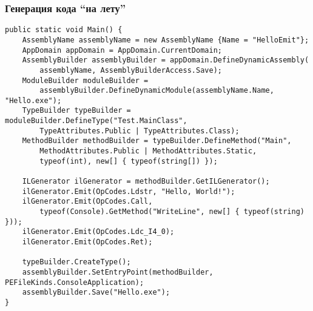 \documentclass{../../slides-style}
\begin{document}
    \begin{frame}[fragile]
        \frametitle{Генерация кода \enquote{на лету}}
        \begin{scriptsize}
            \begin{verbatim}
public static void Main() {
    AssemblyName assemblyName = new AssemblyName {Name = "HelloEmit"};
    AppDomain appDomain = AppDomain.CurrentDomain;
    AssemblyBuilder assemblyBuilder = appDomain.DefineDynamicAssembly(
        assemblyName, AssemblyBuilderAccess.Save);
    ModuleBuilder moduleBuilder = 
        assemblyBuilder.DefineDynamicModule(assemblyName.Name, "Hello.exe");
    TypeBuilder typeBuilder = moduleBuilder.DefineType("Test.MainClass",
        TypeAttributes.Public | TypeAttributes.Class);
    MethodBuilder methodBuilder = typeBuilder.DefineMethod("Main",
        MethodAttributes.Public | MethodAttributes.Static,
        typeof(int), new[] { typeof(string[]) });

    ILGenerator ilGenerator = methodBuilder.GetILGenerator();
    ilGenerator.Emit(OpCodes.Ldstr, "Hello, World!");
    ilGenerator.Emit(OpCodes.Call,
        typeof(Console).GetMethod("WriteLine", new[] { typeof(string) }));
    ilGenerator.Emit(OpCodes.Ldc_I4_0);
    ilGenerator.Emit(OpCodes.Ret);

    typeBuilder.CreateType();
    assemblyBuilder.SetEntryPoint(methodBuilder, PEFileKinds.ConsoleApplication);
    assemblyBuilder.Save("Hello.exe");
}
            \end{verbatim}
        \end{scriptsize}
    \end{frame}
\end{document}
